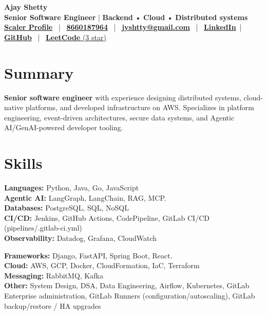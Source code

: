 \documentclass[11 pt]{article}
\begin{document}
\begin{center}
    {\LARGE \textbf{Ajay Shetty}} \\[4pt]
    \textbf{Senior Software Engineer} | \textbf{Backend} • \textbf{Cloud} • \textbf{ Distributed systems} \\[6pt]

    \href{https://www.scaler.com/academy/profile/e30cd4a603ce/}{\textbf{Scaler Profile}} \, | \,
    \href{tel:8660187964}{\textbf{8660187964}} \, | \,
    \href{mailto:jyshtty@gmail.com}{\textbf{jyshtty@gmail.com}} \, | \,
    \href{https://www.linkedin.com/in/ajay-shetty-2b5901ab/}{\textbf{LinkedIn}} \,|\,
    \href{https://github.com/jyshtty}{\textbf{GitHub}} \, | \,
    \href{https://leetcode.com/u/jyshtty/}{\textbf{LeetCode} (3 star)}
\end{center}

\section*{\textbf{Summary}}
\textbf{Senior software engineer}  with experience designing distributed systems, cloud-native platforms, and developed infrastructure on AWS. Specializes in platform engineering, event-driven architectures, secure data systems, and Agentic AI/GenAI-powered developer tooling.



\section*{\textbf{Skills}}

\noindent
\begin{minipage}[t]{0.48\textwidth}
\textbf{Languages:} Python, Java, Go, JavaScript \\[1pt]
\textbf{Agentic AI:} LangGraph, LangChain, RAG, MCP. \\[1pt]
\textbf{Databases:} PostgreSQL, SQL, NoSQL \\[1pt]
\textbf{CI/CD:} Jenkins, GitHub Actions, CodePipeline, GitLab CI/CD (pipelines/.gitlab-ci.yml) \\[1pt]
\textbf{Observability:} Datadog, Grafana, CloudWatch
\end{minipage}
\hfill
\begin{minipage}[t]{0.48\textwidth}
\textbf{Frameworks:} Django, FastAPI, Spring Boot, React.  \\[1pt]
\textbf{Cloud:} AWS, GCP, Docker, CloudFormation, IaC, Terraform \\[1pt]
\textbf{Messaging:} RabbitMQ, Kafka \\[1pt]
\textbf{Other:} System Design, DSA, Data Engineering, Airflow, Kubernetes, GitLab Enterprise administration, GitLab Runners (configuration/autoscaling), GitLab backup/restore / HA upgrades
\end{minipage}
\end{document}
